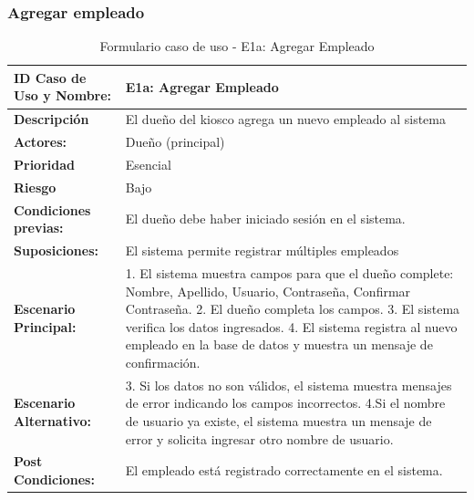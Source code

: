 \documentclass[twoside]{article}
\begin{document}
\subsubsection{Agregar empleado}
\begin{table}[!htbp] %
  \centering
  \caption{Formulario caso de uso - E1a: Agregar Empleado}
    \begin{tabular}{|l|l|}
    \toprule
    \rowcolor[rgb]{ .635,  .973,  .882} \textbf{ID Caso de Uso y Nombre:} & \cellcolor[rgb]{ .867,  .922,  .969} E1a: Agregar Empleado \\
    \midrule
    \rowcolor[rgb]{ .635,  .973,  .882} \textbf{Descripción} & \cellcolor[rgb]{ .867,  .922,  .969} El dueño del kiosco agrega un nuevo empleado al sistema \\
    \midrule
    \rowcolor[rgb]{ .635,  .973,  .882} \textbf{Actores:} & \cellcolor[rgb]{ .867,  .922,  .969} Dueño (principal) \\
    \midrule
    \rowcolor[rgb]{ .635,  .973,  .882} \textbf{Prioridad} & \multicolumn{1}{p{27.07em}|}{\cellcolor[rgb]{ .867,  .922,  .969} Esencial} \\
    \midrule
    \rowcolor[rgb]{ .635,  .973,  .882} \textbf{Riesgo} & \multicolumn{1}{p{27.07em}|}{\cellcolor[rgb]{ .867,  .922,  .969} Bajo} \\
    \midrule
    \rowcolor[rgb]{ .635,  .973,  .882} \textbf{Condiciones previas:} & \multicolumn{1}{p{27.07em}|}{\cellcolor[rgb]{ .867,  .922,  .969} El dueño debe haber iniciado sesión en el sistema.} \\
    \midrule
    \rowcolor[rgb]{ .635,  .973,  .882} \textbf{Suposiciones:} & \cellcolor[rgb]{ .867,  .922,  .969} El sistema permite registrar múltiples empleados \\
    \midrule
    \rowcolor[rgb]{ .635,  .973,  .882} \textbf{Escenario Principal:} & \multicolumn{1}{p{27.07em}|}{\cellcolor[rgb]{ .867,  .922,  .969} 1. El sistema muestra campos para que el dueño complete: Nombre, Apellido, Usuario, Contraseña, Confirmar Contraseña.\newline{} 2. El dueño completa los campos.\newline{} 3. El sistema verifica los datos ingresados.\newline{} 4. El sistema registra al nuevo empleado en la base de datos y muestra un mensaje de confirmación.} \\
    \midrule
    \rowcolor[rgb]{ .635,  .973,  .882} \textbf{Escenario Alternativo:} & \multicolumn{1}{p{27.07em}|}{\cellcolor[rgb]{ .867,  .922,  .969} 3. Si los datos no son válidos, el sistema muestra mensajes de error indicando los campos incorrectos. \newline{} 4.Si el nombre de usuario ya existe, el sistema muestra un mensaje de error y solicita ingresar otro nombre de usuario. } \\
    \midrule
    \rowcolor[rgb]{ .635,  .973,  .882} \textbf{Post Condiciones:} & \cellcolor[rgb]{ .867,  .922,  .969} El empleado está registrado correctamente en el sistema. \\
    \bottomrule
    \end{tabular}%
  \label{tab:addlabel}%
\end{table}%
\newpage
\end{document}
